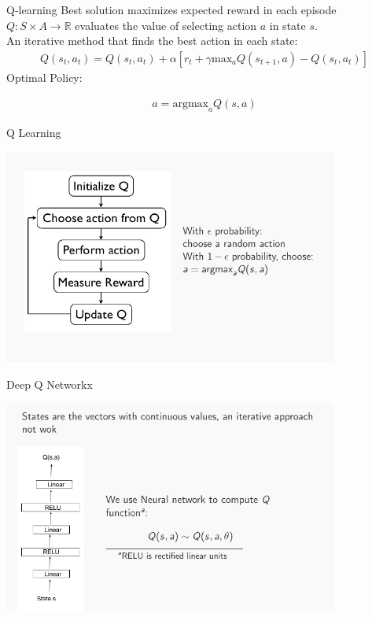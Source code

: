 \documentclass{beamer}
\begin{document}
\begin{frame}{Q-learning}
Best solution maximizes expected reward in each episode $Q: S \times A \longrightarrow \mathbb{R}$ evaluates the value of selecting action $a$ in state $s$. \\
\vspace{0.3cm}
An iterative method that finds the best action in each state: 
\begin{align*}
Q(s_t, a_t) = Q(s_t, a_t) + \alpha [r_t + \gamma \text{max}_a Q(s_{t+1}, a) - Q(s_t, a_t)]
\end{align*}
Optimal Policy: 

\begin{align*}
a = \text{argmax}_a Q(s,a)
\end{align*}

\end{frame}

\begin{frame}{Q Learning}
\begin{center}
	\includegraphics[width=11cm]{iimas/q-learning.pdf}
\end{center}
\end{frame}

\begin{frame}{Deep Q Networkx}
\begin{center}
	\includegraphics[width=11cm]{iimas/dqn.pdf}
\end{center}
\end{frame}
\end{document}
